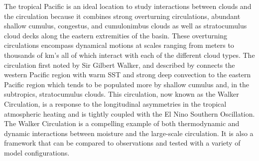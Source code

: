 \documentclass[draft]{agujournal2019}
\begin{document}
The tropical Pacific is an ideal location to study interactions between clouds and the circulation 
because it combines strong overturning circulations, abundant shallow cumulus, congestus, and cumulonimbus 
clouds \cite{Johnson1999} as well as stratocumulus cloud decks along the eastern extremities of the basin.
These overturning circulations encompass dynamical motions at scales
ranging from meters to thousands of km's all of which interact with each of the different cloud types.
The circulation first noted by Sir Gilbert Walker, and described by  connects the 
western Pacific region with warm SST and strong deep convection to the eastern Pacific region which tends to 
be populated more by shallow cumulus and, in the subtropics, stratocumulus clouds.  
This circulation, now known as the Walker Circulation, is a response to the 
longitudinal asymmetries in the tropical atmospheric heating and is tightly coupled with 
the El Nino Southern Oscillation.    
The Walker Circulation is a compelling example of both thermodynamic and dynamic interactions
between moisture and the large-scale circulation.  It is also a framework that can be compared 
to observations and tested with a variety of model configurations. 

\end{document}
